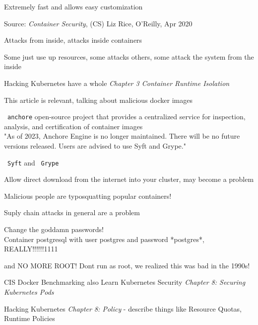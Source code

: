 \documentclass[Screen16to9,17pt]{foils}
\begin{document}
\centerline{Extremely fast and allows easy customization}



Source: \emph{Container Security}, (CS) Liz Rice, O'Reilly, Apr 2020

\begin{list2}
\item Attacks from inside, attacks inside containers
\item Some just use up resources, some attacks others, some attack the system from the inside
\item Hacking Kubernetes have a whole \emph{Chapter 3 Container Runtime Isolation}
\end{list2}



This article is relevant, talking about malicious docker images\\


\begin{list2}
\item \faWrench\ \verb+anchore+ open-source project that provides a centralized service for inspection, analysis, and certification of container images
\\
"As of 2023, Anchore Engine is no longer maintained. There will be no future versions released. Users are advised to use Syft and Grype."
\item \faWrench\ \verb+Syft+  and \faWrench\ \verb+Grype+ 
\item Allow direct download from the internet into your cluster, may become a problem
\item Malicious people are typosquatting popular containers!
\item Suply chain attacks in general are a problem
\end{list2}


\begin{list2}
\item Change the goddamn passwords!\\
Container postgresql with user postgres and password *postgres*, REALLY!!!!!!1111
\item and NO MORE ROOT! Dont run as root, we realized this was bad in the 1990s!
\item CIS Docker Benchmarking also Learn Kubernetes Security \emph{Chapter 8: Securing Kubernetes Pods}
\item Hacking Kubernetes \emph{Chapter 8: Policy} - describe things like Resource Quotas, Runtime Policies
\end{list2}
\end{document}

